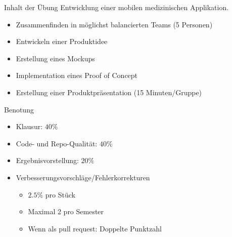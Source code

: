 \documentclass[aspectratio=169,t]{beamer}
\begin{document}
\begin{frame}{Inhalt der Übung}
Entwicklung einer mobilen medizinischen Applikation.
    \begin{itemize}
        \item<2-> Zusammenfinden in möglichst balancierten Teams (5 Personen)
        \item<3-> Entwickeln einer Produktidee
        \item<4-> Erstellung eines Mockups
        \item<5-> Implementation eines Proof of Concept
        \item<6-> Erstellung einer Produktpräsentation (15 Minuten/Gruppe)
    \end{itemize}
\end{frame}

\begin{frame}{Benotung}
 \begin{itemize}
     \item<1-> Klausur: $40\%$
     \item<2-> Code- und Repo-Qualität: $40\%$
     \item<4-> Ergebnisvorstellung: $20\%$
     \item<5-> Verbesserungsvorschläge/Fehlerkorrekturen
     \begin{itemize}
         \item $2.5\%$ pro Stück
	 \item Maximal 2 pro Semester
	 \item Wenn als pull request: Doppelte Punktzahl
     \end{itemize}
 \end{itemize}
\end{frame}
\end{document}
